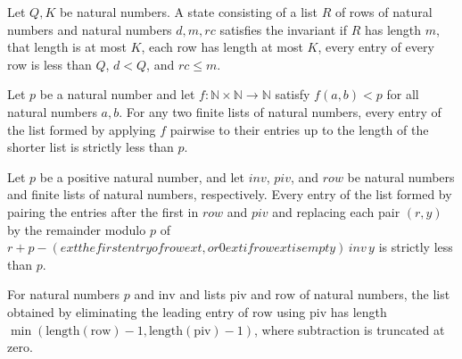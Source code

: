 \begin{definition}
\label{Complexity.BinArith.LInv}
\leanok
{}
Let $Q,K$ be natural numbers. A state consisting of a list $R$ of rows of natural
numbers and natural numbers $d,m,rc$ satisfies the invariant if $R$ has length $m$, that
length is at most $K$, each row has length at most $K$, every entry of every row is less
than $Q$, $d<Q$, and $rc\le m$.
\end{definition}

\begin{theorem}
\label{Complexity.BinArith.lt_of_mem_zipWith}
\leanok
{}
Let $p$ be a natural number and let $f:\mathbb{N}\times\mathbb{N}\to\mathbb{N}$ satisfy
$f(a,b)<p$ for all natural numbers $a,b$. For any two finite lists of natural numbers,
every entry of the list formed by applying $f$ pairwise to their entries up to the
length of the shorter list is strictly less than $p$.
\end{theorem}

\begin{theorem}
\label{Complexity.BinArith.lt_of_mem_elimRow}
\leanok
{}
Let $p$ be a positive natural number, and let $inv$, $piv$, and $row$ be natural numbers
and finite lists of natural numbers, respectively. Every entry of the list formed by
pairing the entries after the first in $row$ and $piv$ and replacing each pair $(r,y)$
by the remainder modulo $p$ of $r+p-(	ext{the first entry of }row	ext{, or }0	ext{ if
}row	ext{ is empty})\,inv\, y$ is strictly less than $p$.
\end{theorem}

\begin{theorem}
\label{Complexity.BinArith.length_elimRow}
\leanok
{}
For natural numbers $p$ and $\mathrm{inv}$ and lists $\mathrm{piv}$ and $\mathrm{row}$
of natural numbers, the list obtained by eliminating the leading entry of $\mathrm{row}$
using $\mathrm{piv}$ has length
$\min(\mathrm{length}(\mathrm{row})-1,\mathrm{length}(\mathrm{piv})-1)$, where
subtraction is truncated at zero.
\end{theorem}

